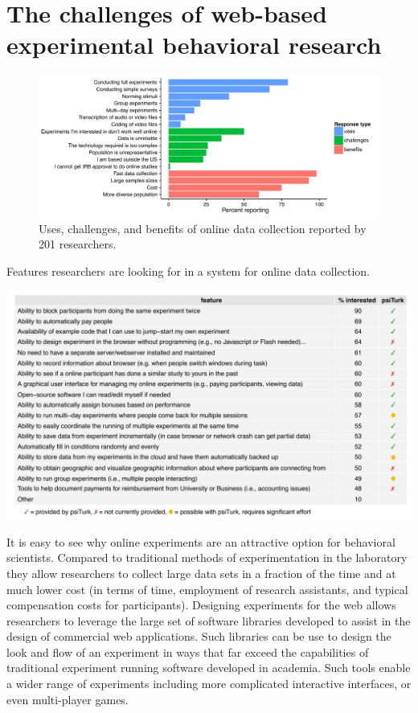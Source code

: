 \documentclass[twocolumn]{svjour3}          %
\begin{document}
\section{The challenges of web-based experimental behavioral research}

\begin{figure}[tp]
\centering
\includegraphics[width=\textwidth]{figures/combinedquestionsedited.pdf}
\caption{Uses, challenges, and benefits of online data collection reported by 201 researchers.}
\label{fig:survey}
\end{figure}

\begin{table}[tp]
\centering
\caption{Features researchers are looking for in a system for online data collection.}
\includegraphics[width=\textwidth]{figures/featuresTable.pdf}
\label{tab:features}
\end{table}


It is easy to see why online experiments are an attractive option for behavioral 
scientists.  Compared to traditional methods of experimentation in the laboratory
they allow researchers to collect large data sets in a fraction of the time and at 
much lower cost (in terms of time, employment of research assistants, and typical 
compensation costs for participants).  Designing experiments for the web allows 
researchers to leverage the large set of software libraries developed to assist 
in the design of commercial web applications.  Such libraries can be use to 
design the look and flow of an experiment in ways that far exceed the capabilities 
of traditional experiment running software developed in academia.  Such tools 
enable a wider range of experiments including more complicated interactive
interfaces, or even multi-player games.
\end{document}
